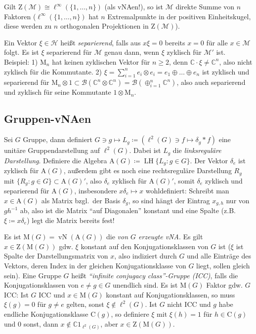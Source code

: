\documentclass[11pt,a4paper]{scrartcl}
\newcommand{\C}{\mathbb{C}} %
\newcommand{\Hc}{\mathcal{H}}
\newcommand{\B}{\mathcal{B}}
\newcommand{\M}{\mathcal{M}}
\theoremstyle{plain}
\theoremstyle{definition}
\theoremstyle{remark}
\DeclareMathOperator{\LH}{LH}
\DeclareMathOperator{\vN}{vN}
\begin{document}
Gilt $\mathrm{Z}(\M)\cong \ell^\infty(\{1,\dots,n\})$ (als vNAen!), so ist $\M$ direkte Summe von $n$ Faktoren ($\ell^\infty(\{1,\dots,n\})$ hat $n$ Extremalpunkte in der positiven Einheitskugel, diese werden zu $n$ orthogonalen Projektionen in $\mathrm{Z}(\M)$).

Ein Vektor $\xi\in \Hc$ heißt \emph{separierend}, falls aus $x\xi=0$ bereits $x=0$ für alle $x\in \M$ folgt. Es ist $\xi$ separierend für $\M$ genau dann, wenn $\xi$ zyklisch für $\M'$ ist. Beispiel: 1) $\mathrm{M}_n$ hat keinen zyklischen Vektor für $n\geq 2$, denn $\C \cdot \xi \neq \C^n$, also nicht zyklisch für die Kommutante. 2) $\xi = \sum_{i=1}^n e_i\otimes e_i = e_1 \oplus \dots \oplus e_n$ ist zyklisch und separierend für $\mathrm{M}_n \otimes 1 \subset \B(\C^n\otimes \C^n) = \B(\oplus_{i=1}^n \C^n)$, also auch separierend und zyklisch für seine Kommutante $1\otimes \mathrm{M}_n$.

\subsection{Gruppen-vNAen}

Sei $G$ Gruppe, dann definiert $G\ni g\mapsto L_g \coloneqq (\ell^2(G)\ni f\mapsto \delta_g\ast f)$ eine unitäre Gruppendarstellung auf $\ell^2(G)$. Dabei ist $L_g$ die \emph{linksreguläre Darstellung}. Definiere die Algebra $\mathrm{A}(G)\coloneqq \LH \{ L_g: g\in G\}$. Der Vektor $\delta_e$ ist zyklisch für $\mathrm{A}(G)$, außerdem gibt es noch eine rechtsreguläre Darstellung $R_g$ mit $\{R_g: g\in G\}\subset \mathrm{A}(G)'$, also $\delta_e$ zyklisch für $\mathrm{A}(G)'$, somit $\delta_e$ zyklisch und separierend für $\mathrm{A}(G)$, insbesondere $x\delta_e\mapsto x$ wohldefiniert: Schreibt man $x\in \mathrm{A}(G)$ als Matrix bzgl.\ der Basis $\delta_g$, so sind hängt der Eintrag $x_{g,h}$ nur von $gh^{-1}$ ab, also ist die Matrix \enquote{auf Diagonalen} konstant und eine Spalte (z.B. $\xi\coloneqq x\delta_e$) legt die Matrix bereits fest!

Es ist $\mathrm{M}(G)=\vN(\mathrm{A}(G))$ die \emph{von $G$ erzeugte vNA}. Es gilt $x\in \mathrm{Z}(\mathrm{M}(G))$ gdw. $\xi$ konstant auf den Konjugationsklassen von $G$ ist ($\xi$ ist Spalte der Darstellungsmatrix von $x$, also indiziert durch $G$ und alle Einträge des Vektors, deren Index in der gleichen Konjugationsklasse von $G$ liegt, sollen gleich sein). Eine Gruppe $G$ heißt \emph{\enquote{infinite conjugacy class}-Gruppe (ICC)}, falls die Konjugationsklassen von $e\neq g\in G$ unendlich sind. Es ist $\mathrm{M}(G)$ Faktor gdw. $G$ ICC: Ist $G$ ICC und $x\in \mathrm{M}(G)$ konstant auf Konjugationsklassen, so muss $\xi(g)=0$ für $g\neq e$ gelten, sonst $\xi \not\in \ell^2(G)$. Ist $G$ nicht ICC und $g$ habe endliche Konjugationsklasse $\mathrm{C}(g)$, so definiere $\xi$ mit $\xi(h)=1$ für $h\in \mathrm{C}(g)$ und $0$ sonst, dann $x\not \in \C 1_{\ell^2(G)}$, aber $x\in \mathrm{Z}(\mathrm{M}(G))$.
\end{document}
